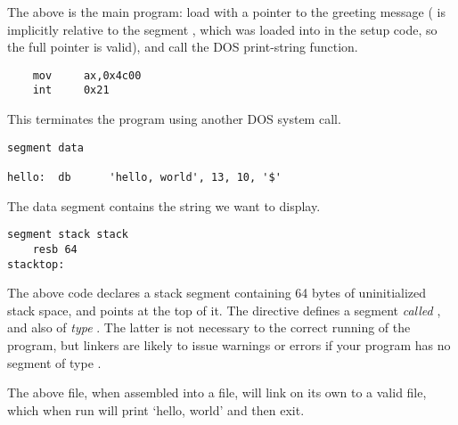 The above is the main program: load  with a pointer to the
greeting message ( is implicitly relative to the segment
, which was loaded into  in the setup code, so the
full pointer is valid), and call the DOS print-string function.

\begin{lstlisting}
    mov     ax,0x4c00
    int     0x21
\end{lstlisting}

This terminates the program using another DOS system call.

\begin{lstlisting}
segment data

hello:  db      'hello, world', 13, 10, '$'
\end{lstlisting}

The data segment contains the string we want to display.

\begin{lstlisting}
segment stack stack
    resb 64
stacktop:
\end{lstlisting}

The above code declares a stack segment containing 64 bytes of
uninitialized stack space, and points  at the top of it.
The directive  defines a segment \emph{called}
, and also of \emph{type} . The latter is not
necessary to the correct running of the program, but linkers are
likely to issue warnings or errors if your program has no segment of
type .

The above file, when assembled into a  file, will link on
its own to a valid  file, which when run will print `hello,
world' and then exit.
